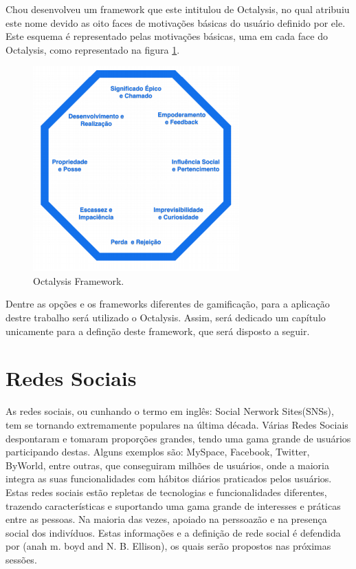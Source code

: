 Chou desenvolveu um framework que este intitulou de Octalysis, no qual atribuiu
este nome devido as oito faces de motivações básicas do usuário definido por ele.
Este esquema é representado pelas motivações básicas, uma em cada face do Octalysis,
como representado na figura \ref{fig:octalysisex}.

\begin{figure}[h]
    \centering
    \includegraphics[width=300px, scale=1]{figuras/octalysisex}
    \caption{Octalysis Framework.}
    \label{fig:octalysisex}
\end{figure}

Dentre as opções e os frameworks diferentes de gamificação, para a aplicação
destre trabalho será utilizado o Octalysis. Assim, será dedicado um capítulo
unicamente para a definção deste framework, que será disposto a seguir.



\section{Redes Sociais}
\label{sec:redessociais}
As redes sociais, ou cunhando o termo em inglês: Social Nerwork Sites(SNSs),
tem se tornando extremamente populares na última década. 
Várias
Redes Sociais despontaram e tomaram proporções grandes, tendo uma gama grande
de usuários participando destas. Alguns exemplos são: MySpace, Facebook, Twitter,
ByWorld, entre outras, que conseguiram milhões de usuários, onde a maioria integra
as suas funcionalidades com hábitos diários praticados pelos usuários.
Estas redes sociais estão repletas de tecnologias e funcionalidades diferentes,
trazendo características e suportando uma gama grande de interesses e práticas
entre as pessoas. Na maioria das vezes, apoiado na perssoazão e na presença social
dos indivíduos. Estas informações e a definição de rede social é defendida por
(anah m. boyd and N. B. Ellison), os quais serão propostos nas próximas sessões.
